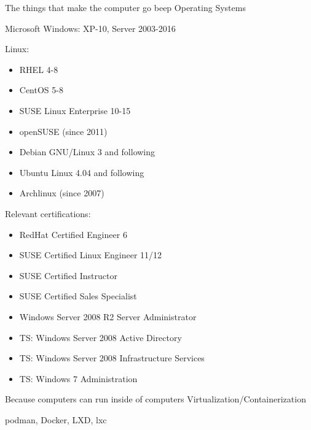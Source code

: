 

\begin{cventries}
  \cventry
    {The things that make the computer go beep}
    {Operating Systems}
		{}
    {}
    {
			\begin{cvitems}
				\item Microsoft Windows: XP-10, Server 2003-2016
				\item Linux:
          \begin{itemize}
            \item RHEL 4-8
            \item CentOS 5-8
            \item SUSE Linux Enterprise 10-15
            \item openSUSE (since 2011)
            \item Debian GNU/Linux 3 and following
            \item Ubuntu Linux 4.04 and following
            \item Archlinux (since 2007)
          \end{itemize}
        \item Relevant certifications:
          \begin{itemize}
            \item RedHat Certified Engineer 6
            \item SUSE Certified Linux Engineer 11/12
            \item SUSE Certified Instructor
            \item SUSE Certified Sales Specialist
            \item Windows Server 2008 R2 Server Administrator
            \item TS: Windows Server 2008 Active Directory
            \item TS: Windows Server 2008 Infrastructure Services
            \item TS: Windows 7 Administration
          \end{itemize}
      \end{cvitems}
    }
  \cventry
    {Because computers can run inside of computers}
    {Virtualization/Containerization}
    {}
    {}
    {
      \begin{cvitems}
        \item podman, Docker, LXD, lxc

\end{cvitems}}
\end{cventries}
